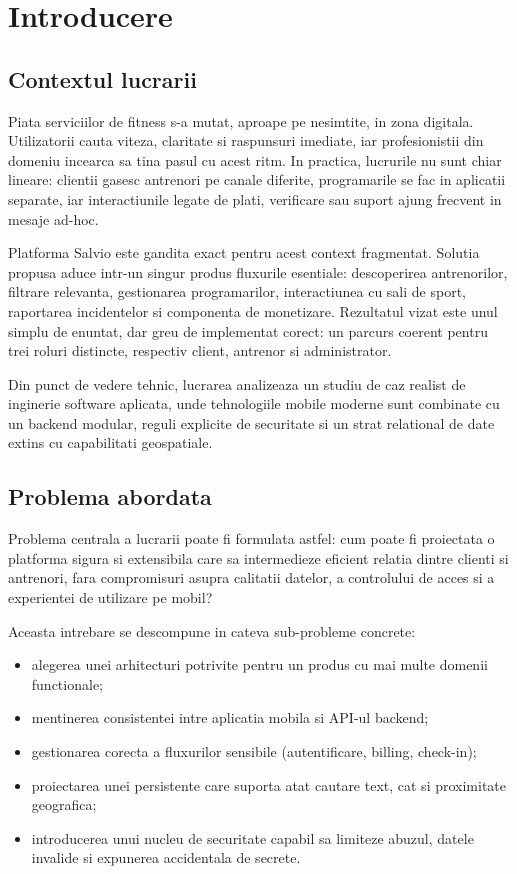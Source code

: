 \chapter{Introducere}

\section{Contextul lucrarii}

Piata serviciilor de fitness s-a mutat, aproape pe nesimtite, in zona digitala. Utilizatorii cauta viteza, claritate si raspunsuri imediate, iar profesionistii din domeniu incearca sa tina pasul cu acest ritm. In practica, lucrurile nu sunt chiar lineare: clientii gasesc antrenori pe canale diferite, programarile se fac in aplicatii separate, iar interactiunile legate de plati, verificare sau suport ajung frecvent in mesaje ad-hoc.

Platforma Salvio este gandita exact pentru acest context fragmentat. Solutia propusa aduce intr-un singur produs fluxurile esentiale: descoperirea antrenorilor, filtrare relevanta, gestionarea programarilor, interactiunea cu sali de sport, raportarea incidentelor si componenta de monetizare. Rezultatul vizat este unul simplu de enuntat, dar greu de implementat corect: un parcurs coerent pentru trei roluri distincte, respectiv client, antrenor si administrator.

Din punct de vedere tehnic, lucrarea analizeaza un studiu de caz realist de inginerie software aplicata, unde tehnologiile mobile moderne sunt combinate cu un backend modular, reguli explicite de securitate si un strat relational de date extins cu capabilitati geospatiale.

\section{Problema abordata}

Problema centrala a lucrarii poate fi formulata astfel: cum poate fi proiectata o platforma sigura si extensibila care sa intermedieze eficient relatia dintre clienti si antrenori, fara compromisuri asupra calitatii datelor, a controlului de acces si a experientei de utilizare pe mobil?

Aceasta intrebare se descompune in cateva sub-probleme concrete:
\begin{itemize}[leftmargin=1.2cm]
    \item alegerea unei arhitecturi potrivite pentru un produs cu mai multe domenii functionale;
    \item mentinerea consistentei intre aplicatia mobila si API-ul backend;
    \item gestionarea corecta a fluxurilor sensibile (autentificare, billing, check-in);
    \item proiectarea unei persistente care suporta atat cautare text, cat si proximitate geografica;
    \item introducerea unui nucleu de securitate capabil sa limiteze abuzul, datele invalide si expunerea accidentala de secrete.
\end{itemize}

